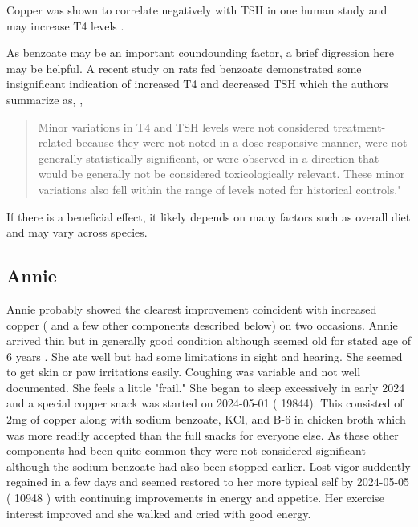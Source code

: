 Copper was shown to correlate negatively with TSH
in one human study and may increase T4 levels 
\cite{10.3389/fendo.2023.1134208}.


As benzoate may be an important coundounding factor,
a brief digression here may be helpful. 
A recent study on rats fed benzoate demonstrated
some insignificant indication of increased T4 and decreased
TSH which the authors summarize as,
\cite{TURNBULL2021104897}
,
\begin{quote}
Minor variations in T4 and TSH levels were not considered treatment-related because they were not noted in a dose responsive manner, were not generally statistically significant, or were observed in a direction that would be generally not be considered toxicologically relevant. These minor variations also fell within the range of levels noted for historical controls."
\end{quote}

If there is a beneficial effect, it likely depends on many factors
such as overall diet and may vary across species.


\subsection{Annie}

\mjmanniecu

Annie probably showed the clearest improvement
coincident with increased copper ( and a few other components
described below)  on two occasions. 
Annie arrived  thin but in generally good condition although 
seemed old for stated age of 6 years
. She ate well
but had some limitations in sight and hearing. She
seemed to get skin or paw irritations easily.
Coughing was variable and not well documented.
She feels a little "frail."
She began to sleep excessively in early 2024 
and a  special copper snack was started on 2024-05-01 ( 19844).
This consisted of 2mg of copper along with sodium benzoate, KCl,
and B-6 in chicken broth which was more readily accepted than the 
full snacks for everyone else. 
As these other components had been quite common they were not
considered significant although the sodium benzoate had also been 
stopped earlier. 
Lost vigor suddently regained in a few days
and seemed restored to her more typical self by
 2024-05-05 ( 10948 ) with continuing improvements in 
energy and appetite.
Her exercise interest improved and she walked and cried
with good energy. 

